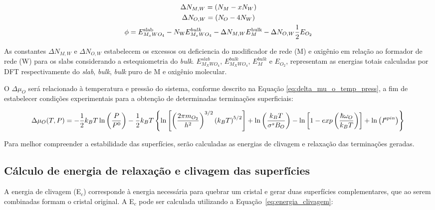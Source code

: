 \begin{subequations}
\vspace{-1.0cm}
\begin{gather}
\Delta N_{M,W} = (N_M - xN_W) \label{eq:delta_M_W} \\
\Delta N_{O,W} = (N_O - 4N_W) \label{eq:delta_O_W} \\
\phi = E^{ \text{slab}}_{M_xWO_4} - N_{\text{W}}E^{bulk}_{M_xWO_4} - \Delta N_{M,W}E^{\text{bulk}}_{M} - \Delta N_{O,W}\frac{1}{2}E_{O_2} \label{eq:fi}
\end{gather}
\end{subequations}

As constantes $\Delta N_{M,W}$ e $\Delta N_{O,W}$ estabelecem os excessos ou deficiencia do modificador de rede (M) e oxigênio em relação ao formador de rede (W) para os slabs considerando a estequiometria do \textit{bulk}. $E^{slab}_{M_{X}WO_{4}}$, $E^{bulk}_{M_{X}WO_{4}}$, $E^{bulk}_{M}$ e $E_{O_{2}}$, representam as energias totais calculadas por DFT respectivamente do \textit{slab}, \textit{bulk}, \textit{bulk} puro de M e oxigênio molecular.

O ${\Delta}{\mu_O}$ será relacionado à temperatura e pressão do sistema, conforme descrito na Equação \ref{eq:delta_mu_o_temp_press}, a fim de estabelecer condições experimentais para a obtenção de determinadas terminações superficiais:

\begin{dmath}
\Delta \mu_{O}(T,P) = -\frac{1}{2}k_BT \ln \left(\frac{P}{P^0}\right) -\frac{1}{2}k_BT \left\{\ln \left[\left( \frac{2\pi m_{O_2}}{h^2} \right)^{3/2} \left(k_BT \right)^{5/2}\right] + \ln \left(\frac{k_BT}{\sigma^s B_O}\right) - \ln \left[1  - exp\left(\frac{\hbar \omega_O}{k_B T}\right)\right] + \ln \left(\textit{I}^{spin} \right)\right\} \\
\label{eq:delta_mu_o_temp_press}
\end{dmath}

Para melhor compreender a estabilidade das superfícies, serão calculadas as energias de clivagem e relaxação das terminações geradas.

\subsection{Cálculo de energia de relaxação e clivagem das superfícies}
A energia de clivagem (E$_c$) corresponde à energia necessária para quebrar um cristal e gerar duas superfícies complementares, que ao serem combinadas formam o cristal original. A E$_c$ pode ser calculada utilizando a Equação~\ref{eq:energia_clivagem}:

